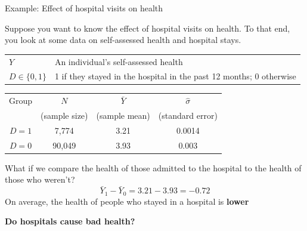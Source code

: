 \documentclass[compress, 8pt]{beamer}
\begin{document}
\begin{frame}{Example: Effect of hospital visits on health}

Suppose you want to know the effect of hospital visits on health. To that end, you look at some data on self-assessed health and hospital stays.
\pause
\begin{table}
\begin{tabular}{ll}
$Y$ & An individual's self-assessed health \\
$D \in \{0, 1\}$ & 1 if they stayed in the hospital in the past 12 months; 0 otherwise
\end{tabular}
\end{table}

\begin{table}
\begin{tabular}{cccc}
Group &$N$  &$\bar{Y}$  &$\hat{\sigma}$  \\
&(sample size) &(sample mean) &(standard error) \\
\hline
$D=1$ &7,774 &3.21 &0.0014 \\
$D=0$ &90,049 &3.93 &0.003 \\
\end{tabular}
\end{table}

\pause
\vspace{2ex}
What if we compare the health of those admitted to the hospital to the health of those who weren't?
\begin{equation*}
\bar{Y}_1 - \bar{Y}_0 = 3.21 - 3.93 = -0.72
\end{equation*}
\pause
On average, the health of people who stayed in a hospital is \textbf{lower}

\vspace{1ex}
\textbf{Do hospitals cause bad health?}
\end{frame}
\end{document}
